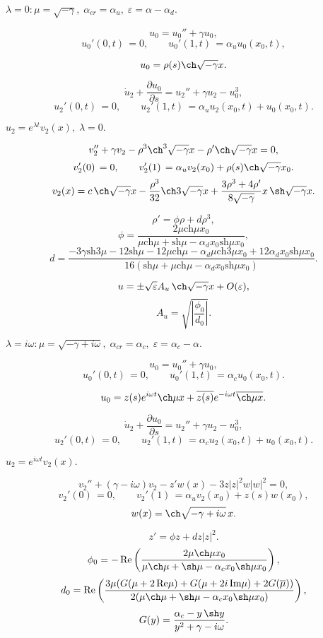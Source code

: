 \documentclass[12pt]{extarticle}
\begin{document}
$ \lambda = 0: \mu = \sqrt{-\gamma}, \; \alpha_{cr} = \alpha_u, \; \varepsilon=\alpha-\alpha_d. $

$$	u_0 = u_0'' + \gamma u_0, $$
$$	u_0'(0, t) \, = 0, \qquad u_0'(1, t) \, = \alpha_u u_0(x_0, t), $$

$$ u_0 = \rho(s) \ch \sqrt{-\gamma} x. $$

$$ \dot u_2 + \frac{\partial u_0}{\partial s} = u_2'' + \gamma u_2 - u_0^3, $$
$$ u_2'(0, t) \, = 0, \qquad u_2'(1, t) \, = \alpha_u u_2(x_0, t) + u_0(x_0, t). $$

$ u_2 = e^{\lambda t}v_2(x), \; \lambda = 0. $

$$	v_2'' + \gamma v_2 - \rho^3 \ch^3 \sqrt{-\gamma} x - \rho' \ch \sqrt{-\gamma} x = 0, $$
$$	v_2'(0) \, = 0, \qquad v_2'(1) \, = \alpha_u v_2(x_0) + \rho(s) \ch \sqrt{-\gamma} x_0. $$
$$ v_2(x) = c \, \ch \sqrt{-\gamma} x - \frac{\rho^3}{32} \ch 3\sqrt{-\gamma} x + \frac{3\rho^3 + 4\rho'}{8\sqrt{-\gamma}} x \, \sh \sqrt{-\gamma} x. $$

$$	\rho' = \phi \rho + d \rho^3, $$
$$ \phi = \frac{ 2 \mu \mbox{ch} \mu x_0 }{ \mu \mbox{ch} \mu +\mbox{sh} \mu - \alpha_d x_0 \mbox{sh} \mu x_0 }, $$
$$ d = \frac{ -3\gamma \mbox{sh} 3\mu - 12 \mbox{sh} \mu - 12 \mu \mbox{ch} \mu - \alpha_d \mu \mbox{ch} 3\mu x_0 + 12 \alpha_d x_0 \mbox{sh} \mu x_0 }{ 16( \mbox{sh} \mu + \mu \mbox{ch} \mu - \alpha_d x_0 \mbox{sh} \mu x_0 ) }. $$

$$ u = \pm \sqrt{ \varepsilon } A_u \, \ch \sqrt{-\gamma} x + O(\varepsilon), $$
$$ A_u = \sqrt{\left|\dfrac{\phi_0}{d_0}\right|}. $$

$ \lambda = i \omega: \mu = \sqrt{-\gamma + i \omega}, \; \alpha_{cr} = \alpha_c, \; \varepsilon=\alpha_c-\alpha. $

$$	u_0 = u_0'' + \gamma u_0, $$
$$	u_0'(0, t) \, = 0, \qquad u_0'(1, t) \, = \alpha_c u_0(x_0, t). $$

$$ u_0 = z(s) e^{i \omega t} \ch \mu x + \overline{z(s)} e^{-i \omega t} \overline{\ch \mu x}. $$

$$	\dot u_2 + \frac{\partial u_0}{\partial s} = u_2'' + \gamma u_2 - u_0^3, $$
$$	u_2'(0, t) \, = 0, \qquad u_2'(1, t) \, = \alpha_c u_2(x_0, t) + u_0(x_0, t). $$

$ u_2 = e^{i \omega t} v_2(x). $

$$	v_2'' + (\gamma - i \omega) v_2 - z' w(x) - 3z|z|^2 w|w|^2 = 0, $$
$$	v_2'(0) \, = 0, \qquad v_2'(1) \, = \alpha_u v_2(x_0) + z(s) w(x_0), $$
$$ w(x) = \ch \sqrt{-\gamma + i \omega} \, x. $$

$$	z' = \phi z + d z |z|^2. $$
$$ \phi_0 = -\operatorname{Re} \left( \frac{ 2 \mu \ch \mu x_0 }{ \mu \ch \mu +\sh \mu - \alpha_c x_0 \sh \mu x_0 } \right), $$
$$ d_0 = \operatorname{Re} \left( \frac{ 3 \mu ( G(\mu + 2\,\mbox{Re}\mu) + G(\mu + 2i\,\mbox{Im}\mu) + 2G(\overline{\mu}) ) }{ 2 ( \mu \ch \mu +\sh \mu - \alpha_c x_0 \sh \mu x_0 ) } \right), $$
$$ G(y) = \frac{ \alpha_c - y\,\sh y }{ y^2 + \gamma - i\omega }. $$
\end{document}

